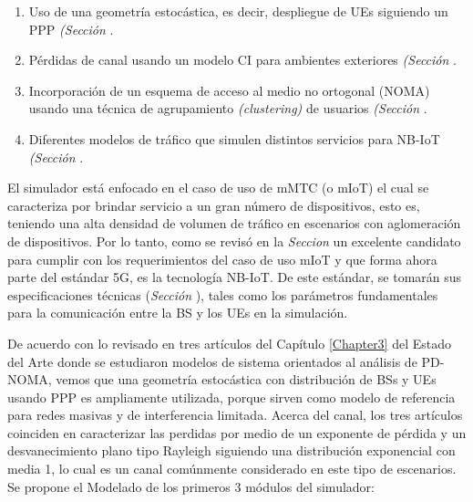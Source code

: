 \begin{enumerate}
    \item  Uso de una geometría estocástica, es decir, despliegue de UEs siguiendo un PPP \textit{(Sección }.
    \item  Pérdidas de canal usando un modelo CI para ambientes exteriores \textit{(Sección }.
    \item  Incorporación de un esquema de acceso al medio no ortogonal (NOMA) usando una técnica de agrupamiento \textit{(clustering)} de usuarios \textit{(Sección }.
    \item  Diferentes modelos de tráfico que simulen distintos servicios para NB-IoT \textit{(Sección }.
\end{enumerate}

El simulador está enfocado en el caso de uso de mMTC (o mIoT) el cual se caracteriza por brindar servicio a un gran número de dispositivos, esto es, teniendo una alta densidad de volumen de tráfico en escenarios con aglomeración de dispositivos. Por lo tanto, como se revisó en la \textit{Seccion } un excelente candidato para cumplir con los requerimientos del caso de uso mIoT y que forma ahora parte del estándar 5G, es la tecnología NB-IoT. De este estándar, se tomarán sus especificaciones técnicas (\textit{Sección }), tales como los parámetros fundamentales para la comunicación entre la BS y los UEs en la simulación.\newline

De acuerdo con lo revisado en tres artículos del Capítulo \ref{Chapter3} del Estado del Arte \parencite{Kouzayha2018} \parencite{Zhang2017} \parencite{Shahini2019} donde se estudiaron modelos de sistema orientados al análisis de PD-NOMA, vemos que una geometría estocástica con distribución de BSs y UEs usando PPP es ampliamente utilizada, porque sirven como modelo de referencia para redes masivas y de interferencia limitada. Acerca del canal, los tres artículos coinciden en caracterizar las perdidas por medio de un exponente de pérdida y un desvanecimiento plano tipo Rayleigh siguiendo una distribución exponencial con media 1, lo cual es un canal comúnmente considerado en este tipo de escenarios. \newline
Se propone el Modelado de los primeros 3 módulos del simulador:

